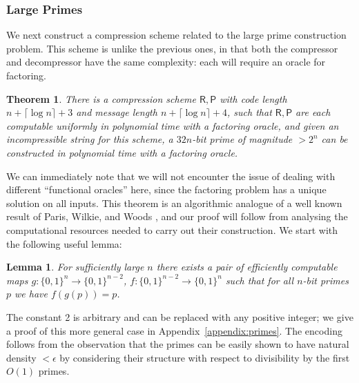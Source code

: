 \documentclass[11pt]{article}
\newtheorem{theorem}{Theorem}
\newtheorem{lemma}{Lemma}
\newcommand{\B}{\{0,1\}}
\begin{document}
\subsubsection{Large Primes}\label{subsubsec:primes}
We next construct a compression scheme related to the large prime construction problem. This scheme is unlike the previous ones, in that both the compressor and decompressor have the same complexity: each will require an oracle for factoring. 
\begin{theorem}\label{thm:primes-in-apepp}
There is a compression scheme $\mathsf{R}, \mathsf{P}$ with code length $n + \lceil \log n \rceil + 3$ and message length $n + \lceil \log n \rceil + 4$, such that $\mathsf{R},\mathsf{P}$ are each computable uniformly in polynomial time with a factoring oracle, and given an incompressible string for this scheme, a $32n$-bit prime of magnitude $>2^n$ can be constructed in polynomial time with a factoring oracle.
\end{theorem}
We can immediately note that we will not encounter the issue of dealing with different ``functional oracles'' here, since the factoring problem has a unique solution on all inputs. This theorem is an algorithmic analogue of a well known result of Paris, Wilkie, and Woods \cite{Paris-Wilkie-Woods}, and our proof will follow from analysing the computational resources needed to carry out their construction. We start with the following useful lemma:
\begin{lemma}\label{lem:divisibility-coding}
For sufficiently large $n$ there exists a pair of efficiently computable maps $g\colon \B^n \rightarrow \B^{n-2}$, $f\colon \B^{n-2} \rightarrow \B^n$ such that for all $n$-bit primes $p$ we have $f(g(p)) = p$.
\end{lemma} 
The constant 2 is arbitrary and can be replaced with any positive integer; we give a proof of this more general case in Appendix~\ref{appendix:primes}. The encoding follows from the observation that the primes can be easily shown to have natural density $< \epsilon$ by considering their structure with respect to divisibility by the first $O(1)$ primes.
\end{document}
